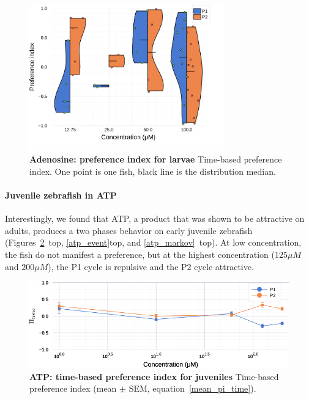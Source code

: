   \begin{figure}[h!]
      \centering
      \includegraphics[width=0.75\textwidth]{part_2/assets/dist_adenosine_lar.png}
      \caption{\textbf{Adenosine: preference index for larvae} Time-based preference index. One point is one fish, black line is the distribution median.}
      \label{dist_adenosine_lar}
    \end{figure}

  \paragraph{Juvenile zebrafish in ATP} Interestingly, we found that ATP, a product that was shown to be attractive on adults, produces a two phases behavior on early juvenile zebrafish (Figures~\ref{atp}~top, \ref{atp_event}top, and \ref{atp_markov}~top). At low concentration, the fish do not manifest a preference, but at the highest concentration ($125 \mu  M$  and $200 \mu M$), the P1 cycle is repulsive and the P2 cycle attractive.

    \begin{figure}[h!]
      \centering
      \includegraphics[width=1\textwidth]{part_2/assets/atp.png}
      \caption{\textbf{ATP: time-based preference index for juveniles} Time-based preference index (mean $\pm$ SEM, equation~\ref{mean_pi_time}).}
      \label{atp}
    \end{figure}

